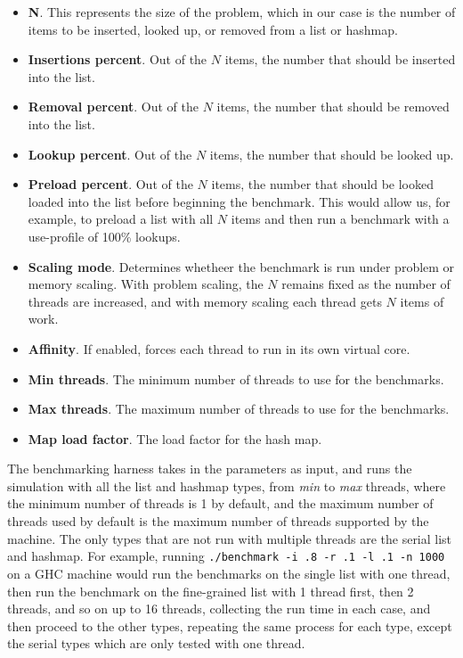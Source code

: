 \documentclass[11pt]{article}
\begin{document}
\begin{itemize}
\item
{\bf N}. This represents the size of the problem, which in our case is the
number of items to be inserted, looked up, or removed from a list or hashmap.
\item
{\bf Insertions percent}. Out of the $N$ items, the number that should be
inserted into the list.
\item
{\bf Removal percent}. Out of the $N$ items, the number that should be removed
into the list.
\item
{\bf Lookup percent}. Out of the $N$ items, the number that should be looked up.
\item
{\bf Preload percent}. Out of the $N$ items, the number that should be looked
loaded into the list before beginning the benchmark. This would allow us, for
example, to preload a list with all $N$ items and then run a benchmark with a
use-profile of 100\% lookups.
\item
{\bf Scaling mode}. Determines whetheer the benchmark is run under problem or
memory scaling. With problem scaling, the $N$ remains fixed as the number of
threads are increased, and with memory scaling each thread gets $N$ items of
work.
\item
{\bf Affinity}. If enabled, forces each thread to run in its own virtual core.
\item
{\bf Min threads}. The minimum number of threads to use for the benchmarks.
\item
{\bf Max threads}. The maximum number of threads to use for the benchmarks.
\item
{\bf Map load factor}. The load factor for the hash map.
\end{itemize}

The benchmarking harness takes in the parameters as input, and runs the
simulation with all the list and hashmap types, from {\it min} to {\it max}
threads, where the minimum number of threads is 1 by default, and the maximum
number of threads used by default is the maximum number of threads supported by
the machine. The only types that are not run with multiple threads are the
serial list and hashmap. For example, running
{\tt ./benchmark -i .8 -r .1 -l .1 -n 1000} on a GHC machine would run the
benchmarks on the single list with one thread, then run the benchmark on the
fine-grained list with 1 thread first, then 2 threads, and so on up to 16
threads, collecting the run time in each case, and then proceed to the other
types, repeating the same process for each type, except the serial types which
are only tested with one thread.
\end{document}
